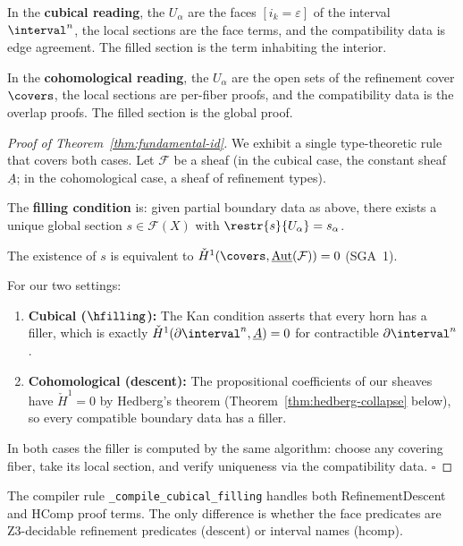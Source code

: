 In the \textbf{cubical reading}, the \(U_\alpha\) are the faces
\([i_k = \varepsilon]\) of the interval \(\interval^n\), the local
sections are the face terms, and the compatibility data is edge
agreement.  The filled section is the term inhabiting the interior.

In the \textbf{cohomological reading}, the \(U_\alpha\) are the open
sets of the refinement cover \(\covers\), the local sections are
per-fiber proofs, and the compatibility data is the overlap proofs.
The filled section is the global proof.

\begin{proof}[Proof of Theorem~\ref{thm:fundamental-id}]
We exhibit a single type-theoretic rule that covers both cases.
Let \(\mathcal{F}\) be a sheaf (in the cubical case, the constant
sheaf \(\underline{A}\); in the cohomological case, a sheaf of
refinement types).

The \textbf{filling condition} is: given partial boundary data as
above, there exists a unique global section
\(s \in \mathcal{F}(X)\) with \(\restr{s}{U_\alpha} = s_\alpha\).

The existence of \(s\) is equivalent to
\(\check{H}^1(\covers, \underline{\mathrm{Aut}}(\mathcal{F})) = 0\)
(SGA~1).

For our two settings:
\begin{enumerate}
\item \textbf{Cubical (\(\hfilling\)):}  The Kan condition asserts
  that every horn has a filler, which is exactly
  \(\check{H}^1(\partial\interval^n, \underline{A}) = 0\) for
  contractible \(\partial\interval^n\).

\item \textbf{Cohomological (descent):}  The propositional coefficients
  of our sheaves have \(\check{H}^1 = 0\) by Hedberg's theorem
  (Theorem~\ref{thm:hedberg-collapse} below), so every compatible
  boundary data has a filler.
\end{enumerate}
In both cases the filler is computed by the same algorithm: choose any
covering fiber, take its local section, and verify uniqueness via the
compatibility data. \hfill\(\square\)
\end{proof}

\begin{corollary}
The compiler rule \texttt{\_compile\_cubical\_filling} handles both
\textsf{RefinementDescent} and \textsf{HComp} proof terms.  The
only difference is whether the face predicates are Z3-decidable
refinement predicates (descent) or interval names (hcomp).
\end{corollary}


